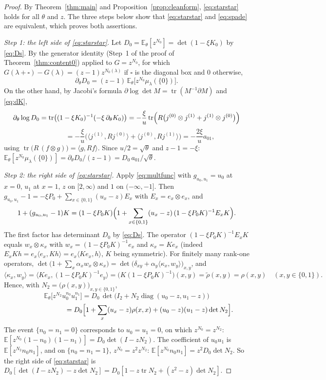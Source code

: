 \documentclass[11pt]{article}
\theoremstyle{definition}
\theoremstyle{remark}
\newcommand{\E}{\mathbb{E}}
\newcommand{\tr}{\operatorname{tr}}
\begin{document}
\begin{proof}
By Theorem~\ref{thm:main} and Proposition~\ref{prop:cleanform}, \eqref{eq:starstar} holds for all $\theta$ and $z$. The three steps below show that \eqref{eq:starstar} and \eqref{eq:spade} are equivalent, which proves both assertions.

\emph{Step 1: the left side of \eqref{eq:starstar}.} Let $D_0=\E_\theta[z^{N_0}]=\det(1-\xi K_0)$ by \eqref{eq:Ds}. By the generator identity (Step~1 of the proof of Theorem~\ref{thm:content0}) applied to $G=z^{N_0}$, for which $G(\lambda+\square)-G(\lambda)=(z-1)z^{N_0(\lambda)}$ if $\square$ is the diagonal box and $0$ otherwise,
\[
\partial_\theta D_0=(z-1)\,\E_\theta\bigl[z^{N_0}\mu_\lambda(\{0\})\bigr].
\]
On the other hand, by Jacobi's formula $\partial\log\det M=\tr(M^{-1}\partial M)$ and \eqref{eq:dK},
\[
\partial_\theta\log D_0=\tr\bigl((1-\xi K_0)^{-1}(-\xi\,\partial_\theta K_0)\bigr)=-\frac{\xi}{u}\tr\Bigl(R\bigl(j^{(0)}\otimes j^{(1)}+j^{(1)}\otimes j^{(0)}\bigr)\Bigr)
\]
\[
\phantom{\partial_\theta\log D_0}=-\frac{\xi}{u}\bigl(\langle j^{(1)},Rj^{(0)}\rangle+\langle j^{(0)},Rj^{(1)}\rangle\bigr)=-\frac{2\xi}{u}a_{01},
\]
using $\tr\bigl(R\,(f\otimes g)\bigr)=\langle g,Rf\rangle$. Since $u/2=\sqrt\theta$ and $z-1=-\xi$: $\E_\theta[z^{N_0}\mu_\lambda(\{0\})]=\partial_\theta D_0/(z-1)=D_0\,a_{01}/\sqrt\theta$.

\emph{Step 2: the right side of \eqref{eq:starstar}.} Apply \eqref{eq:multfunc} with $g_{u_0,u_1}=u_0$ at $x=0$, $u_1$ at $x=1$, $z$ on $[2,\infty)$ and $1$ on $(-\infty,-1]$. Then $g_{u_0,u_1}-1=-\xi P_0+\sum_{x\in\{0,1\}}(u_x-z)E_x$ with $E_x=e_x\otimes e_x$, and
\[
1+(g_{u_0,u_1}-1)K=(1-\xi P_0K)\Bigl(1+\sum_{x\in\{0,1\}}(u_x-z)\,(1-\xi P_0K)^{-1}E_xK\Bigr).
\]
The first factor has determinant $D_0$ by \eqref{eq:Ds}. The operator $(1-\xi P_0K)^{-1}E_xK$ equals $w_x\otimes\kappa_x$ with $w_x=(1-\xi P_0K)^{-1}e_x$ and $\kappa_x=Ke_x$ (indeed $E_xKh=e_x\langle e_x,Kh\rangle=e_x\langle Ke_x,h\rangle$, $K$ being symmetric). For finitely many rank-one operators, $\det\bigl(1+\sum_x\alpha_xw_x\otimes\kappa_x\bigr)=\det\bigl(\delta_{xy}+\alpha_y\langle\kappa_x,w_y\rangle\bigr)_{x,y}$, and
\[
\langle\kappa_x,w_y\rangle=\langle Ke_x,(1-\xi P_0K)^{-1}e_y\rangle=\bigl(K(1-\xi P_0K)^{-1}\bigr)(x,y)=\tilde\rho(x,y)=\rho(x,y)\quad(x,y\in\{0,1\}).
\]
Hence, with $N_2=\bigl(\rho(x,y)\bigr)_{x,y\in\{0,1\}}$,
\[
\E_\theta\bigl[z^{N_2}u_0^{n_0}u_1^{n_1}\bigr]=D_0\,\det\bigl(I_2+N_2\operatorname{diag}(u_0-z,u_1-z)\bigr)
\]
\[
\phantom{\E_\theta\bigl[z^{N_2}u_0^{n_0}u_1^{n_1}\bigr]}=D_0\Bigl[1+\sum_x(u_x-z)\rho(x,x)+(u_0-z)(u_1-z)\det N_2\Bigr].
\]
The event $\{n_0=n_1=0\}$ corresponds to $u_0=u_1=0$, on which $z^{N_0}=z^{N_2}$: $\E[z^{N_0}(1-n_0)(1-n_1)]=D_0\det(I-zN_2)$. The coefficient of $u_0u_1$ is $\E[z^{N_2}n_0n_1]$, and on $\{n_0=n_1=1\}$, $z^{N_0}=z^2z^{N_2}$: $\E[z^{N_0}n_0n_1]=z^2D_0\det N_2$. So the right side of \eqref{eq:starstar} is $D_0[\det(I-zN_2)-z\det N_2]=D_0[1-z\tr N_2+(z^2-z)\det N_2]$.


\end{proof}
\end{document}
